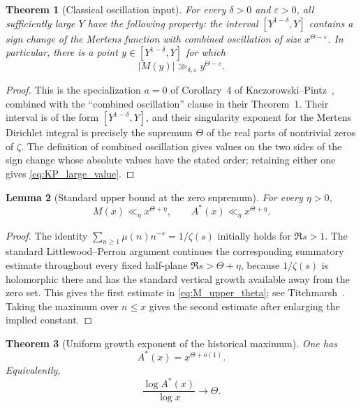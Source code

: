 \documentclass[11pt]{amsart}
\numberwithin{equation}{section}
\theoremstyle{plain}
\newtheorem{theorem}{Theorem}[section]
\newtheorem{lemma}[theorem]{Lemma}
\theoremstyle{definition}
\theoremstyle{remark}
\begin{document}
\begin{theorem}[Classical oscillation input]
\label{thm:KP_input}
For every \(\delta>0\) and \(\varepsilon>0\), all sufficiently large \(Y\)
have the following property: the interval
\([Y^{1-\delta},Y]\) contains a sign change of the Mertens function with
combined oscillation of size \(x^{\Theta-\varepsilon}\).  In particular,
there is a point \(y\in[Y^{1-\delta},Y]\) for which
\begin{equation}
|M(y)|\gg_{\delta,\varepsilon}y^{\Theta-\varepsilon}.
\label{eq:KP_large_value}
\end{equation}
\end{theorem}

\begin{proof}
This is the specialization \(a=0\) of Corollary~4 of
Kaczorowski--Pintz~\cite{KaczorowskiPintz1986}, combined with the
``combined oscillation'' clause in their Theorem~1.  Their interval is of the
form \([Y^{1-\delta},Y]\), and their singularity exponent for the Mertens
Dirichlet integral is precisely the supremum \(\Theta\) of the real parts of
nontrivial zeros of \(\zeta\).  The definition of combined oscillation gives
values on the two sides of the sign change whose absolute values have the
stated order; retaining either one gives \eqref{eq:KP_large_value}.
\end{proof}

\begin{lemma}[Standard upper bound at the zero supremum]
\label{lem:M_upper_theta}
For every \(\eta>0\),
\begin{equation}
M(x)\ll_\eta x^{\Theta+\eta},
\qquad
A^*(x)\ll_\eta x^{\Theta+\eta}.
\label{eq:M_upper_theta}
\end{equation}
\end{lemma}

\begin{proof}
The identity
\(\sum_{n\ge1}\mu(n)n^{-s}=1/\zeta(s)\) initially holds for
\(\Re s>1\).  The standard Littlewood--Perron argument continues the
corresponding summatory estimate throughout every fixed half-plane
\(\Re s>\Theta+\eta\), because \(1/\zeta(s)\) is holomorphic there and has
the standard vertical growth available away from the zero set.  This gives
the first estimate in \eqref{eq:M_upper_theta}; see
Titchmarsh~\cite{Titchmarsh1986}.  Taking the maximum over \(n\le x\) gives
the second estimate after enlarging the implied constant.
\end{proof}

\begin{theorem}[Uniform growth exponent of the historical maximum]
\label{thm:Astar_theta}
One has
\begin{equation}
\boxed{A^*(x)=x^{\Theta+o(1)}.}
\label{eq:Astar_theta}
\end{equation}
Equivalently,
\begin{equation}
\frac{\log A^*(x)}{\log x}\longrightarrow\Theta.
\label{eq:log_Astar_theta}
\end{equation}
\end{theorem}
\end{document}
